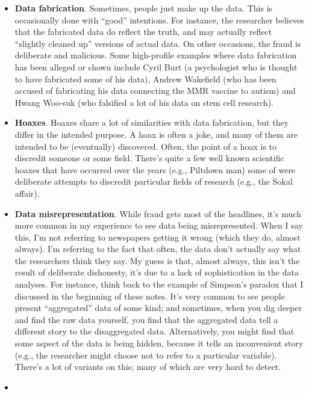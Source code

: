 \documentclass[
]{book}
\begin{document}
\begin{itemize}
\item
  \textbf{Data fabrication}. Sometimes, people just make up the data. This is occasionally done with ``good'' intentions. For instance, the researcher believes that the fabricated data do reflect the truth, and may actually reflect ``slightly cleaned up'' versions of actual data. On other occasions, the fraud is deliberate and malicious. Some high-profile examples where data fabrication has been alleged or shown include Cyril Burt (a psychologist who is thought to have fabricated some of his data), Andrew Wakefield (who has been accused of fabricating his data connecting the MMR vaccine to autism) and Hwang Woo-suk (who falsified a lot of his data on stem cell research).
\item
  \textbf{Hoaxes}. Hoaxes share a lot of similarities with data fabrication, but they differ in the intended purpose. A hoax is often a joke, and many of them are intended to be (eventually) discovered. Often, the point of a hoax is to discredit someone or some field. There's quite a few well known scientific hoaxes that have occurred over the years (e.g., Piltdown man) some of were deliberate attempts to discredit particular fields of research (e.g., the Sokal affair).
\item
  \textbf{Data misrepresentation}. While fraud gets most of the headlines, it's much more common in my experience to see data being misrepresented. When I say this, I'm not referring to newspapers getting it wrong (which they do, almost always). I'm referring to the fact that often, the data don't actually say what the researchers think they say. My guess is that, almost always, this isn't the result of deliberate dishonesty, it's due to a lack of sophistication in the data analyses. For instance, think back to the example of Simpson's paradox that I discussed in the beginning of these notes. It's very common to see people present ``aggregated'' data of some kind; and sometimes, when you dig deeper and find the raw data yourself, you find that the aggregated data tell a different story to the disaggregated data. Alternatively, you might find that some aspect of the data is being hidden, because it tells an inconvenient story (e.g., the researcher might choose not to refer to a particular variable). There's a lot of variants on this; many of which are very hard to detect.
\item

\end{itemize}
\end{document}

